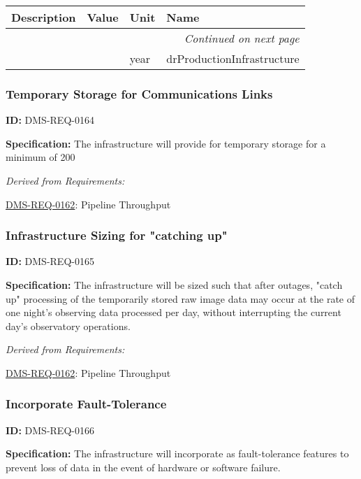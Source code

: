 \documentclass[SE,toc,lsstdraft]{lsstdoc}
\makeatletter
\newcommand{\paramname}[1]{\hspace{0pt}#1}
\newcommand{\unitname}[1]{\hspace{0pt}#1}
\newenvironment{parameters}[0]{%
\setlength\LTleft{0pt}
\setlength\LTright{\fill}
\begin{small}
\begin{longtable}[]{|p{0.5\textwidth}|l|p{0.6in}|p{1.74in}@{}|}

\hline \textbf{Description} & \textbf{Value} & \textbf{Unit} & \textbf{Name} \\ \hline
\endhead

\hline \multicolumn{4}{r}{\emph{Continued on next page}} \\
\endfoot

\hline\hline
\endlastfoot
}{%
\hline
\end{longtable}
\end{small}
}
\makeatother
\begin{document}
\begin{parameters}

&

&
\unitname{%
year
}
&
\paramname{%
drProductionInfrastructure
} \\\hline
\end{parameters}




\subsubsection{Temporary Storage for Communications Links}

\label{DMS-REQ-0164}
\textbf{ID:} DMS-REQ-0164

\textbf{Specification: }The infrastructure will provide for temporary storage for a minimum of 200%






\emph{Derived from Requirements:}

\hyperref[DMS-REQ-0162]{DMS-REQ-0162}:
Pipeline Throughput \newline


\subsubsection{Infrastructure Sizing for "catching up"}

\label{DMS-REQ-0165}
\textbf{ID:} DMS-REQ-0165

\textbf{Specification: }The infrastructure will be sized such that after outages, "catch up" processing of the temporarily stored raw image data may occur at the rate of one night’s observing data processed per day, without interrupting the current day's observatory operations.






\emph{Derived from Requirements:}

\hyperref[DMS-REQ-0162]{DMS-REQ-0162}:
Pipeline Throughput \newline


\subsubsection{Incorporate Fault-Tolerance}

\label{DMS-REQ-0166}
\textbf{ID:} DMS-REQ-0166

\textbf{Specification: }The infrastructure will incorporate as fault-tolerance features to prevent loss of data in the event of hardware or software failure.
\end{document}
